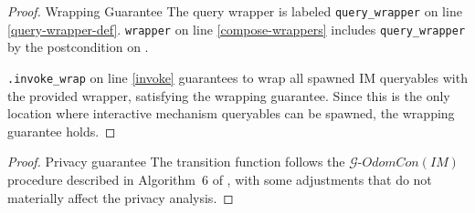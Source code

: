 \documentclass{article}
\begin{document}
\begin{proof} \textup{Wrapping Guarantee}
    The query wrapper is labeled \texttt{query\_wrapper} on line \ref{query-wrapper-def}.
    \texttt{wrapper} on line \ref{compose-wrappers} includes \texttt{query\_wrapper} 
    by the postcondition on .

    \texttt{.invoke\_wrap} on line \ref{invoke} guarantees to wrap all spawned IM queryables with the provided wrapper,
    satisfying the wrapping guarantee.
    Since this is the only location where interactive mechanism queryables can be spawned,
    the wrapping guarantee holds.
\end{proof}

\begin{proof} \textup{Privacy guarantee}
    The transition function follows the $\mathcal{G}\text{-}OdomCon(IM)$ procedure described in Algorithm~6 of \cite{haney2023concurrentcompositioninteractivedifferential},
    with some adjustments that do not materially affect the privacy analysis.


\end{proof}
\end{document}
